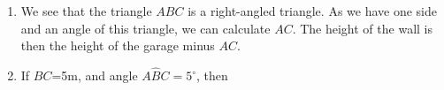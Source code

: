 {\begin{mdframed}[linewidth=4, leftmargin=40, rightmargin=40]
\begin{exercise}
\begin{enumerate}[noitemsep, label=\textbf{Step} \textbf{\arabic*}. ]
            \leftskip=20pt\rightskip=\leftskip\item  
        \label{m39411*id83116}We see that the triangle \begin{math}ABC\end{math} is a right-angled triangle. As we have one side and an angle of this triangle, we can calculate \begin{math}AC\end{math}. The height of the wall is then the height of the garage minus \begin{math}AC\end{math}.\par 
        \item  
        \label{m39411*id83164}If \begin{math}BC\end{math}=5m, and angle \begin{math}A\hat{B}C={5}^{\circ }\end{math}, then\par 
        \label{m39411*id83209}\nopagebreak\noindent{}
\end{enumerate}
\end{exercise}
\end{mdframed}}
